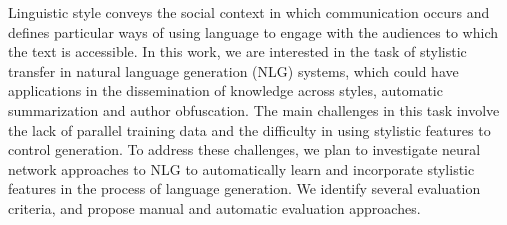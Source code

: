 Linguistic style conveys the social context in which communication occurs and defines particular ways of using language to engage with the audiences to which the text is accessible. In this work, we are interested in the task of stylistic transfer in natural language generation (NLG) systems, which could have applications in the dissemination of knowledge across styles, automatic summarization and author obfuscation. The main challenges in this task involve the lack of parallel training data and the difficulty in using stylistic features to control generation. To address these challenges, we plan to investigate neural network approaches to NLG to automatically learn and incorporate stylistic features in the process of language generation. We identify several evaluation criteria, and propose manual and automatic evaluation approaches.
